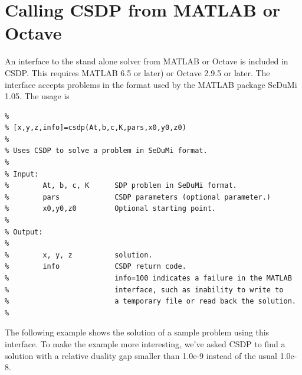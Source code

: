 \documentclass{article}
\begin{document}
\section*{Calling CSDP from MATLAB or Octave}
An interface to the stand alone solver from MATLAB or Octave is
included in CSDP.  This requires MATLAB 6.5 or later) or Octave 2.9.5
or later.  The interface accepts problems in the format used by the
MATLAB package SeDuMi 1.05.  The usage is

\begin{verbatim}
%
% [x,y,z,info]=csdp(At,b,c,K,pars,x0,y0,z0)
%
% Uses CSDP to solve a problem in SeDuMi format.
%
% Input:
%        At, b, c, K      SDP problem in SeDuMi format.
%        pars             CSDP parameters (optional parameter.)
%        x0,y0,z0         Optional starting point.  
%
% Output:
%
%        x, y, z          solution.
%        info             CSDP return code.
%                         info=100 indicates a failure in the MATLAB
%                         interface, such as inability to write to 
%                         a temporary file or read back the solution.
%
\end{verbatim}   

The following example shows the solution of a sample problem using this
interface.  To make the example more interesting, we've asked CSDP to 
find a solution with a relative duality gap smaller than 1.0e-9 instead
of the usual 1.0e-8.  
\end{document}
